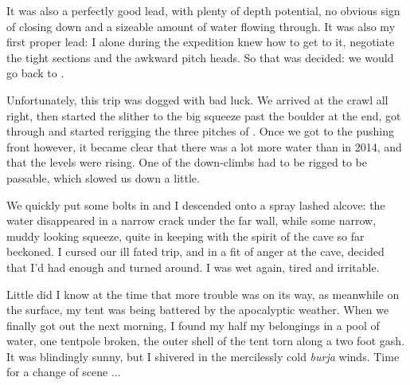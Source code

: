 It was also a perfectly good lead, with plenty of depth potential, no obvious sign of closing down and a sizeable amount of water flowing through. It was also my first proper lead: I alone during the expedition knew how to get to it, negotiate the tight sections and the awkward pitch heads. So that was decided: we would go back to . 

Unfortunately, this trip was dogged with bad luck. We arrived at the  crawl all right, then started the slither to the big squeeze past the boulder at the end, got through and started rerigging the three pitches of . Once we got to the pushing front however, it became clear that there was a lot more water than in 2014, and that the levels were rising. One of the down-climbs had to be rigged to be passable, which slowed us down a little.

We quickly put some bolts in and I descended onto a spray lashed alcove: the water disappeared in a narrow crack under the far wall, while some narrow, muddy looking squeeze, quite in keeping with the spirit of the cave so far beckoned. I cursed our ill fated trip, and in a fit of anger at the cave, decided that I'd had enough and turned around. I was wet again, tired and irritable. 

Little did I know at the time that more trouble was on its way, as meanwhile on the surface, my tent was being battered by the apocalyptic weather. When we finally got out the next morning, I found my half my belongings in a pool of water,  one tentpole broken, the outer shell of the tent torn along a two foot gash. It was blindingly sunny, but I shivered in the mercilessly cold \emph{burja} winds. Time for a change of scene ...


